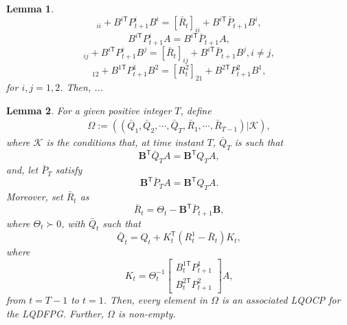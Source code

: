 \documentclass{article}
\newcommand{\transpose}{\mathsf{T}}
\newtheorem{lemma}{Lemma}
\begin{document}
\begin{lemma}\label{lemma:gamePGrelation}
    \begin{equation}
        [R_{t}^{i}]_{ii} + B^{i\transpose}P_{t+1}^{i}B^{i} = [\bar{R}_{t}]_{ii} + B^{i\transpose}\bar{P}_{t+1}B^{i},
    \end{equation}
    \begin{equation}
        B^{i\transpose}P_{t+1}^{i}A = B^{i\transpose}\bar{P}_{t+1}A,
    \end{equation}
    \begin{equation}
        [R_{t}^{i}]_{ij} + B^{i\transpose}P_{t+1}^{i}B^{j} = [\bar{R}_{t}]_{ij} + B^{i\transpose}\bar{P}_{t+1}B^{j},i\neq j,
    \end{equation}
    \begin{equation}
        [R_{t}^{1}]_{12} + B^{1\transpose}P_{t+1}^{1}B^{2} = [R^{2}_{t}]_{21} + B^{2\transpose}P^{2}_{t+1}B^{1},
    \end{equation}
    for $i,j=1,2$. Then, ...
\end{lemma}


\begin{lemma}
    \cite[Theorem 5]{prasad_structure_2023}
    For a given positive integer $T$, define
    \begin{align*}
        \Omega := ((\bar{Q}_{1},\bar{Q}_{2},\cdots,\bar{Q}_{T},\bar{R}_{1},\cdots,\bar{R}_{T-1})|\mathcal{K}),
    \end{align*}
    where $\mathcal{K}$ is the conditions that, at time instant $T$, $\bar{Q}_{T}$ is such that
        \begin{equation}
            \mathbf{B}^{\transpose}\bar{Q}_{T}A = \mathbf{B}^{\transpose}Q_{T}A,
        \end{equation}
        and, let $\bar{P}_{T}$ satisfy
        \begin{equation}
            \mathbf{B}^{\transpose}\bar{P}_{T}A = \mathbf{B}^{\transpose}Q_{T}A.
        \end{equation}
        Moreover, set $\bar{R}_{t}$ as
        \begin{equation}\label{eq:matrixR}
            \bar{R}_{t} = \Theta_{t} - \mathbf{B}^{\transpose}\bar{P}_{t+1}\mathbf{B},
        \end{equation}
        where $\Theta_{t} \succ 0$,
        with $\bar{Q}_{t}$ such that
        \begin{equation}
            \bar{Q}_{t} = Q_{t} + K_{t}^{\transpose}(R_{t}^{1}-\bar{R}_{t})K_{t},
        \end{equation}
        where
        \begin{equation}
            K_{t} = \Theta_{t}^{-1}
            \begin{bmatrix}
                B_{t}^{1\transpose}P_{t+1}^{1}\\
                B_{t}^{2\transpose}P_{t+1}^{2}
            \end{bmatrix}
            A,
        \end{equation}
        from $t=T-1$ to $t=1$.
    Then, every element in $\Omega$ is an associated LQOCP for the LQDFPG. Further, $\Omega$ is non-empty.
\end{lemma}
\end{document}
